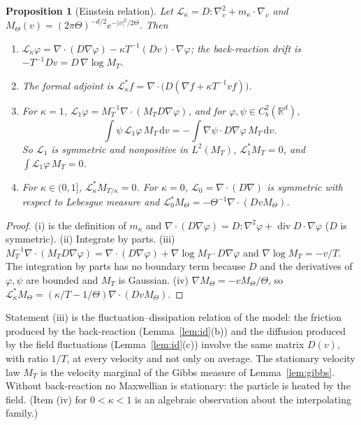 \documentclass[11pt]{article}
\newcommand{\dd}{\mathrm{d}}
\newcommand{\cL}{\mathcal{L}}
\newcommand{\Div}{\operatorname{div}}
\newtheorem{proposition}[theorem]{Proposition}
\theoremstyle{remark}
\begin{document}
\begin{proposition}[Einstein relation]\label{prop:einstein}
Let $\cL_\kappa=D:\nabla_v^2+m_\kappa\cdot\nabla_v$ and
$M_\Theta(v)=(2\pi\Theta)^{-d/2}e^{-|v|^2/2\Theta}$. Then
\begin{enumerate}
  \item[(i)] $\cL_\kappa\varphi=\nabla\cdot(D\nabla\varphi)
     -\kappa T^{-1}(Dv)\cdot\nabla\varphi$; the back-reaction drift is
     $-T^{-1}Dv=D\,\nabla\log M_T$.
  \item[(ii)] The formal adjoint is
     $\cL_\kappa^*f=\nabla\cdot\bigl(D(\nabla f+\kappa T^{-1}vf)\bigr)$.
  \item[(iii)] For $\kappa=1$,
     $\cL_1\varphi=M_T^{-1}\nabla\cdot(M_TD\nabla\varphi)$, and for
     $\varphi,\psi\in C_b^2(\mathbb{R}^d)$,
     \[
       \int\psi\,\cL_1\varphi\,M_T\,\dd v=-\int\nabla\psi\cdot D\nabla\varphi\,M_T\,\dd v .
     \]
     So $\cL_1$ is symmetric and nonpositive in $L^2(M_T)$,
     $\cL_1^*M_T=0$, and $\int\cL_1\varphi\,M_T=0$.
  \item[(iv)] For $\kappa\in(0,1]$, $\cL_\kappa^*M_{T/\kappa}=0$. For
     $\kappa=0$, $\cL_0=\nabla\cdot(D\nabla)$ is symmetric with respect to
     Lebesgue measure and $\cL_0^*M_\Theta=-\Theta^{-1}\nabla\cdot(DvM_\Theta)$.
\end{enumerate}
\end{proposition}

\begin{proof}
(i) is the definition of $m_\kappa$ and
$\nabla\cdot(D\nabla\varphi)=D:\nabla^2\varphi+\Div D\cdot\nabla\varphi$
($D$ is symmetric). (ii) Integrate by parts. (iii)
$M_T^{-1}\nabla\cdot(M_TD\nabla\varphi)=\nabla\cdot(D\nabla\varphi)
+\nabla\log M_T\cdot D\nabla\varphi$ and $\nabla\log M_T=-v/T$. The
integration by parts has no boundary term because $D$ and the derivatives of
$\varphi,\psi$ are bounded and $M_T$ is Gaussian. (iv)
$\nabla M_\Theta=-vM_\Theta/\Theta$, so
$\cL_\kappa^*M_\Theta=(\kappa/T-1/\Theta)\nabla\cdot(DvM_\Theta)$.
\end{proof}

Statement (iii) is the fluctuation--dissipation relation of the model: the
friction produced by the back-reaction (Lemma~\ref{lem:id}(b)) and the
diffusion produced by the field fluctuations (Lemma~\ref{lem:id}(c)) involve
the same matrix $D(v)$, with ratio $1/T$, at every velocity and not only on
average. The stationary velocity law $M_T$ is the velocity marginal of the
Gibbs measure of Lemma~\ref{lem:gibbs}. Without back-reaction no Maxwellian
is stationary: the particle is heated by the field. (Item (iv) for
$0<\kappa<1$ is an algebraic observation about the interpolating family.)
\end{document}
